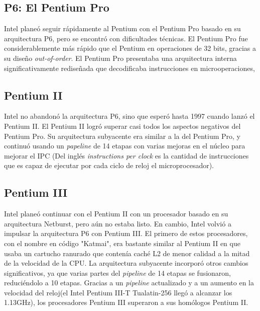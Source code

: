 \subsection{P6: El Pentium Pro}
Intel planeó seguir rápidamente al Pentium con el Pentium Pro basado en su arquitectura P6, pero se encontró con dificultades técnicas. El Pentium Pro fue considerablemente 
más rápido que el Pentium en operaciones de 32 bits, gracias a su diseño \emph{out-of-order}.  El Pentium Pro presentaba una arquitectura interna significativamente rediseñada 
que decodificaba instrucciones en microoperaciones,
\subsection{Pentium II}
Intel no abandonó la arquitectura P6, sino que esperó hasta 1997 cuando lanzó el Pentium II. El Pentium II logró superar casi todos los aspectos negativos del Pentium Pro. 
Su arquitectura subyacente era similar a la del Pentium Pro, y continuó usando un \emph{papeline} de 14 etapas con varias mejoras en el núcleo para mejorar el IPC
(Del inglés \emph{instructions per clock} es la cantidad de instrucciones que es capaz de ejecutar por cada ciclo de reloj el microprocesador).

\subsection{Pentium III}
Intel planeó continuar con el Pentium II con un procesador basado en su arquitectura Netburst, pero aún no estaba listo. En cambio, Intel volvió a impulsar la 
arquitectura P6 con Pentium III. El primero de estos procesadores, con el nombre en código "Katmai", era bastante similar al Pentium II en que usaba un cartucho 
ranurado que contenía caché L2 de menor calidad a la mitad de la velocidad de la CPU. La arquitectura subyacente incorporó otros cambios significativos, ya que varias 
partes del \emph{pipeline} de 14 etapas se fusionaron, reduciéndolo a 10 etapas. Gracias a un \emph{pipeline} actualizado y a un aumento en la velocidad del 
reloj(el Intel Pentium III-T Tualatin-256 llegó a alcanzar los 1.13GHz), los procesadores Pentium III superaron a sus homólogos Pentium II.



